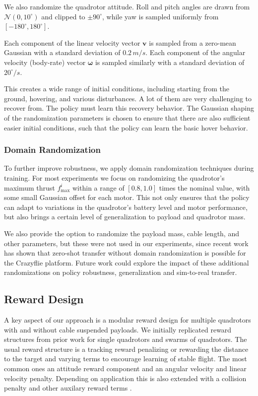 We also randomize the quadrotor attitude. Roll and pitch angles are drawn from $\mathcal{N}(0,10^\circ)$ and clipped to $\pm90^\circ$, while yaw is sampled uniformly from $[-180^\circ,180^\circ]$.

Each component of the linear velocity vector $\mathbf{v}$ is sampled from a zero-mean Gaussian with a standard deviation of $0.2\,m/s$. Each component of the angular velocity (body-rate) vector $\boldsymbol{\omega}$ is sampled similarly with a standard deviation of $20^\circ/s$.

This creates a wide range of initial conditions, including starting from the ground, hovering, and various disturbances. A lot of them are very challenging to recover from. The policy must learn this recovery behavior. The Gaussian shaping of the randomization parameters is chosen to ensure that there are also sufficient easier initial conditions, such that the policy can learn the basic hover behavior.
\subsubsection{Domain Randomization}
To further improve robustness, we apply domain randomization techniques during training. For most experiments we focus on randomizing the quadrotor's maximum thrust $f_{\max}^i$ within a range of $[0.8,1.0]$ times the nominal value, with some small Gaussian offset for each motor. This not only ensures that the policy can adapt to variations in the quadrotor's  battery level and motor performance, but also brings a certain level of generalization to payload and quadrotor mass.

We also provide the option to randomize the payload mass, cable length, and other parameters, but these were not used in our experiments, since recent work \cite{Eschmann2024} has shown that zero-shot transfer without domain randomization is possible for the Crazyflie platform. Future work could explore the impact of these additional randomizations on policy robustness, generalization and sim-to-real transfer.




\subsection{Reward Design}
A key aspect of our approach is a modular reward design for multiple quadrotors with and without cable suspended payloads.
We initially replicated reward structures from prior work for single quadrotors and swarms of quadrotors. The usual reward structure is a tracking reward penalizing or rewarding the distance to the target and varying terms to encourage learning of stable flight. The most common ones an attitude reward component and an angular velocity and linear velocity penalty. Depending on application this is also extended with a collision penalty and other auxilary reward terms \cite{molchanov_sim--multi-real_2019,Eschmann2024,kaufmann_benchmark_2022, huang_collision_2024}.

